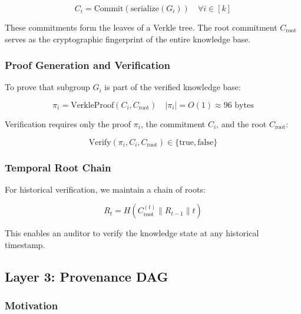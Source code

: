 \documentclass[11pt,a4paper]{article}
\begin{document}
\begin{equation}
C_i = \text{Commit}(\text{serialize}(G_i)) \quad \forall i \in [k]
\label{eq:commit}
\end{equation}

These commitments form the leaves of a Verkle tree. The root commitment $C_{\text{root}}$ serves as the cryptographic fingerprint of the entire knowledge base.

\subsubsection{Proof Generation and Verification}

To prove that subgroup $G_i$ is part of the verified knowledge base:

\begin{equation}
\pi_i = \text{VerkleProof}(C_i, C_{\text{root}}) \quad |\pi_i| = O(1) \approx 96 \text{ bytes}
\label{eq:verkle_proof}
\end{equation}

Verification requires only the proof $\pi_i$, the commitment $C_i$, and the root $C_{\text{root}}$:

\begin{equation}
\text{Verify}(\pi_i, C_i, C_{\text{root}}) \in \{\text{true}, \text{false}\}
\label{eq:verify}
\end{equation}

\subsubsection{Temporal Root Chain}

For historical verification, we maintain a chain of roots:

\begin{equation}
R_t = H(C_{\text{root}}^{(t)} \| R_{t-1} \| t)
\label{eq:temporal}
\end{equation}

This enables an auditor to verify the knowledge state at any historical timestamp.

\subsection{Layer 3: Provenance DAG}
\label{sec:provenance}

\subsubsection{Motivation}
\end{document}

